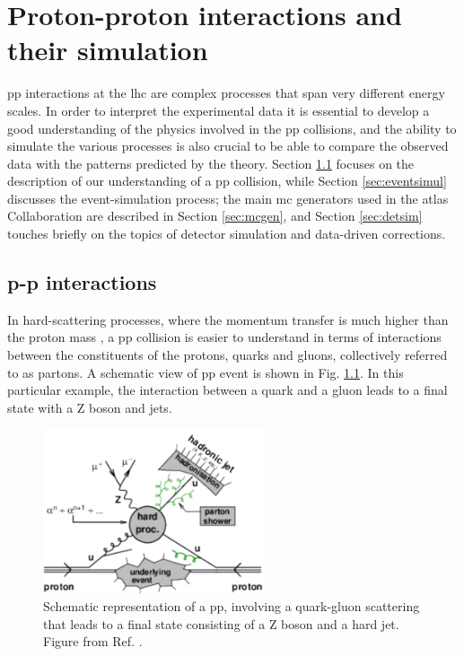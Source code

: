 \chapter{Proton-proton interactions and their simulation}
\label{chap:event:MC}

\Gls{pp} interactions at the \gls{lhc} are complex processes that span very different energy scales. 
In order to interpret the experimental data it is essential to develop a good understanding of the physics involved in the \gls{pp} collisions, and the ability to simulate the various processes is also crucial to be able to compare the observed data with the patterns predicted by the theory.
Section \ref{sec:ppint} focuses on the description of our understanding of a \gls{pp} collision, while Section \ref{sec:eventsimul} 
discusses the event-simulation process; 
the main \gls{mc} generators used in the \gls{atlas} Collaboration are described in Section \ref{sec:mcgen}, and Section \ref{sec:detsim} touches briefly on the topics of detector simulation and data-driven corrections.



\section{p-p interactions}
\label{sec:ppint}

In hard-scattering processes, where the momentum transfer is much higher than the proton mass \cite{Butterworth:2012fj}, 
a \gls{pp} collision is easier to understand in terms of interactions between the constituents of the protons, quarks and gluons, 
collectively referred to as partons. A schematic view of \gls{pp} event is shown in Fig. \ref{fig:sim:pp2}. In this particular example, the interaction between a quark and a gluon leads to a final state with a Z boson and jets. 

\begin{figure}[h]
\begin{center}
    \includegraphics[width=0.58\textwidth]{figures/simul/ppcoll2}
\end{center}
 \caption{Schematic representation of a \gls{pp}, involving a quark-gluon scattering that leads to a final state consisting of a Z boson and a hard jet. Figure from Ref. \cite{Butterworth:2012fj}.}
  \label{fig:sim:pp2}
\end{figure}


